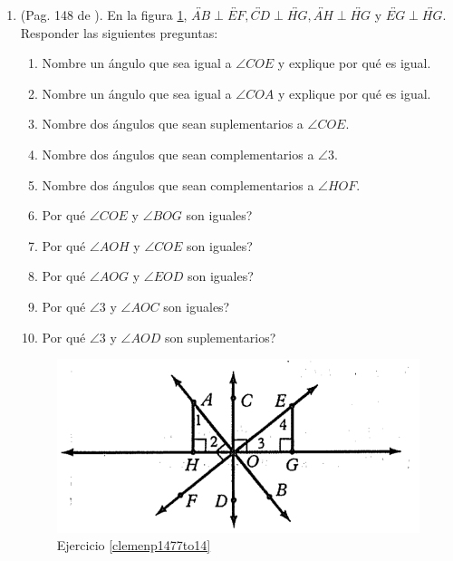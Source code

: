 \begin{enumerate}
	\item \label{clemenp1477to14} (Pag. 148 de \cite{clemens}). En la figura \ref{figclemenp147_7to14}, $\overleftrightarrow{AB} \perp \overleftrightarrow{EF}, \overleftrightarrow{CD} \perp \overleftrightarrow{HG}, \overleftrightarrow{AH} \perp \overleftrightarrow{HG}$ y $\overleftrightarrow{EG} \perp \overleftrightarrow{HG}$. Responder las siguientes preguntas:
	\begin{enumerate}[label=\Alph*) ]
		\item Nombre un ángulo que sea igual a $\angle COE$ y explique por qué es igual.
		\item Nombre un ángulo que sea igual a $\angle COA$ y explique por qué es igual.				
		\item Nombre dos ángulos que sean suplementarios a $\angle COE$.
		\item Nombre dos ángulos que sean complementarios a $\angle 3$.
		\item Nombre dos ángulos que sean complementarios a $\angle HOF$.
		\item Por qué $\angle COE$ y $\angle BOG$ son iguales?
		\item Por qué $\angle AOH$ y $\angle COE$ son iguales?	
		\item Por qué $\angle AOG$ y $\angle EOD$ son iguales?													
		\item Por qué $\angle 3$ y $\angle AOC$ son iguales?	
		\item Por qué $\angle 3$ y $\angle AOD$ son suplementarios?									
	\end{enumerate}
	\begin{figure}[H]
		\centering
		\includegraphics[width=0.7\linewidth]{Geometria/imgs/clemenp147_7to14}
		\caption{Ejercicio \ref{clemenp1477to14}}
		\label{figclemenp147_7to14}
	\end{figure}
	

\end{enumerate}
